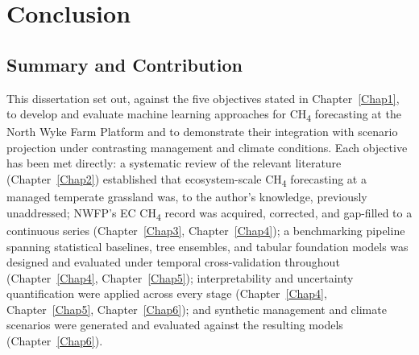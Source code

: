 \chapter{Conclusion} \label{Chap8}

\section{Summary and Contribution}

This dissertation set out, against the five objectives stated in Chapter~\ref{Chap1}, to develop
and evaluate machine learning approaches for CH\textsubscript{4} forecasting at the North Wyke Farm
Platform and to demonstrate their integration with scenario projection under contrasting management
and climate conditions. Each objective has been met directly: a systematic review of the relevant
literature (Chapter~\ref{Chap2}) established that ecosystem-scale CH\textsubscript{4} forecasting at
a managed temperate grassland was, to the author's knowledge, previously unaddressed; NWFP's EC
CH\textsubscript{4} record was acquired, corrected, and gap-filled to a continuous series
(Chapter~\ref{Chap3}, Chapter~\ref{Chap4}); a benchmarking pipeline spanning statistical baselines,
tree ensembles, and tabular foundation models was designed and evaluated under temporal
cross-validation throughout (Chapter~\ref{Chap4}, Chapter~\ref{Chap5}); interpretability and
uncertainty quantification were applied across every stage (Chapter~\ref{Chap4},
Chapter~\ref{Chap5}, Chapter~\ref{Chap6}); and synthetic management and climate scenarios were
generated and evaluated against the resulting models (Chapter~\ref{Chap6}).

